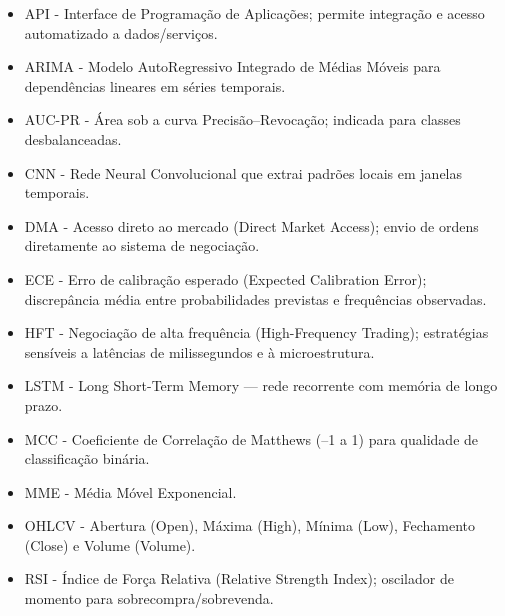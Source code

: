 
\begin{itemize}

\item {API} - Interface de Programação de Aplicações; permite integração e acesso automatizado a dados/serviços.
\item {ARIMA} - Modelo AutoRegressivo Integrado de Médias Móveis para dependências lineares em séries temporais.
\item {AUC-PR} - Área sob a curva Precisão–Revocação; indicada para classes desbalanceadas.
\item {CNN} - Rede Neural Convolucional que extrai padrões locais em janelas temporais.
\item {DMA} - Acesso direto ao mercado (Direct Market Access); envio de ordens diretamente ao sistema de negociação.
\item {ECE} - Erro de calibração esperado (Expected Calibration Error); discrepância média entre probabilidades previstas e frequências observadas.
\item {HFT} - Negociação de alta frequência (High-Frequency Trading); estratégias sensíveis a latências de milissegundos e à microestrutura.
\item {LSTM} - Long Short-Term Memory — rede recorrente com memória de longo prazo.
\item {MCC} - Coeficiente de Correlação de Matthews (–1 a 1) para qualidade de classificação binária.
\item {MME} - Média Móvel Exponencial.
\item {OHLCV} - Abertura (Open), Máxima (High), Mínima (Low), Fechamento (Close) e Volume (Volume).
\item {RSI} - Índice de Força Relativa (Relative Strength Index); oscilador de momento para sobrecompra/sobrevenda.

\end{itemize}